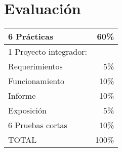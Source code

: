 \documentclass[11pt,letterpaper]{article}
\begin{document}
\section*{Evaluación}

\begin{center}
\begin{tabular}{|l|r|}\hline
	6 Prácticas				&	60\%\\\hline
	1 Proyecto integrador:	&	\\
	\quad Requerimientos				&	5\%\\
	\quad Funcionamiento				&	10\%\\
	\quad Informe						&	10\%\\
	\quad Exposición					&	5\%\\\hline
	
	6 Pruebas cortas		&	10\%\\\hline\hline
	TOTAL					&	100\%\\\hline
\end{tabular}
\end{center}
\end{document}
